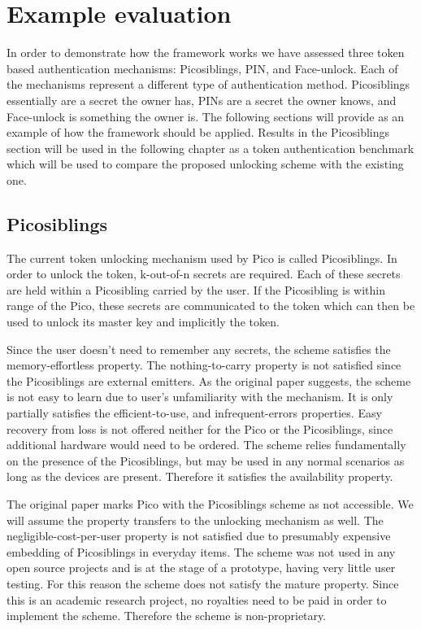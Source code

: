 \section{Example evaluation}
In order to demonstrate how the framework works we have assessed three token based authentication mechanisms: Picosiblings, PIN, and Face-unlock. Each of the mechanisms represent a different type of authentication method. Picosiblings essentially are a secret the owner has, PINs are a secret the owner knows, and Face-unlock is something the owner is. The following sections will provide as an example of how the framework should be applied. Results in the Picosiblings section will be used in the following chapter as a token authentication benchmark which will be used to compare the proposed unlocking scheme with the existing one.

	\subsection{Picosiblings}
	The current token unlocking mechanism used by Pico is called Picosiblings. In order to unlock the token, k-out-of-n secrets are required. Each of these secrets are held within a Picosibling carried by the user. If the Picosibling is within range of the Pico, these secrets are communicated to the token which can then be used to unlock its master key and implicitly the token.
	
	Since the user doesn't need to remember any secrets, the scheme satisfies the memory-effortless property. The nothing-to-carry property is not satisfied since the Picosiblings are external emitters. As the original paper suggests, the scheme is not easy to learn due to user's unfamiliarity with the mechanism. It is only partially satisfies the efficient-to-use, and infrequent-errors properties. Easy recovery from loss is not offered neither for the Pico or the Picosiblings, since additional hardware would need to be ordered. The scheme relies fundamentally on the presence of the Picosiblings, but may be used in any normal scenarios as long as the devices are present. Therefore it satisfies the availability property.
	
	The original paper marks Pico with the Picosiblings scheme as not accessible. We will assume the property transfers to the unlocking mechanism as well. The negligible-cost-per-user property is not satisfied due to presumably expensive embedding of Picosiblings in everyday items. The scheme was not used in any open source projects and is at the stage of a prototype, having very little user testing. For this reason the scheme does not satisfy the mature property. Since this is an academic research project, no royalties need to be paid in order to implement the scheme. Therefore the scheme is non-proprietary.
	
